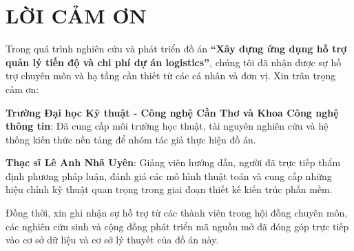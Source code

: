 \chapter*{LỜI CẢM ƠN}

Trong quá trình nghiên cứu và phát triển đồ án \textbf{“Xây dựng ứng dụng hỗ trợ quản lý tiến độ và chi phí dự án logistics”}, chúng tôi đã nhận được sự hỗ trợ chuyên môn và hạ tầng cần thiết từ các cá nhân và đơn vị. Xin trân trọng cảm ơn:

\textbf{Trường Đại học Kỹ thuật - Công nghệ Cần Thơ và Khoa Công nghệ thông tin}: Đã cung cấp môi trường học thuật, tài nguyên nghiên cứu và hệ thống kiến thức nền tảng để nhóm tác giả thực hiện đồ án.

\textbf{Thạc sĩ Lê Anh Nhã Uyên}: Giảng viên hướng dẫn, người đã trực tiếp thẩm định phương pháp luận, đánh giá các mô hình thuật toán và cung cấp những hiệu chỉnh kỹ thuật quan trọng trong giai đoạn thiết kế kiến trúc phần mềm.

Đồng thời, xin ghi nhận sự hỗ trợ từ các thành viên trong hội đồng chuyên môn, các nghiên cứu sinh và cộng đồng phát triển mã nguồn mở đã đóng góp trực tiếp vào cơ sở dữ liệu và cơ sở lý thuyết của đồ án này.
